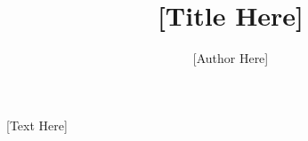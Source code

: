\documentclass[10pt,a4paper,captions=figureheading]{article}
\author{[Author Here]}
\title{[Title Here]}
\begin{document}
\maketitle
\tableofcontents
\newpage

[Text Here]
\end{document}
